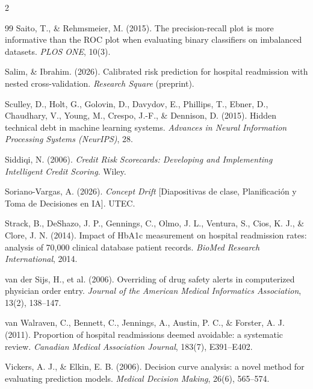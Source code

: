 \documentclass[11pt,a4paper]{article}
\begin{document}
{\begin{multicols}{2}
\begin{thebibliography}{99}
 Saito, T., \& Rehmsmeier, M. (2015). The precision-recall plot is more informative than the ROC plot when evaluating binary classifiers on imbalanced datasets. \emph{PLOS ONE}, 10(3).

 Salim, \& Ibrahim. (2026). Calibrated risk prediction for hospital readmission with nested cross-validation. \emph{Research Square} (preprint).

 Sculley, D., Holt, G., Golovin, D., Davydov, E., Phillips, T., Ebner, D., Chaudhary, V., Young, M., Crespo, J.-F., \& Dennison, D. (2015). Hidden technical debt in machine learning systems. \emph{Advances in Neural Information Processing Systems (NeurIPS)}, 28.

 Siddiqi, N. (2006). \emph{Credit Risk Scorecards: Developing and Implementing Intelligent Credit Scoring}. Wiley.

 Soriano-Vargas, A. (2026). \emph{Concept Drift} [Diapositivas de clase, Planificación y Toma de Decisiones en IA]. UTEC.

 Strack, B., DeShazo, J. P., Gennings, C., Olmo, J. L., Ventura, S., Cios, K. J., \& Clore, J. N. (2014). Impact of HbA1c measurement on hospital readmission rates: analysis of 70,000 clinical database patient records. \emph{BioMed Research International}, 2014.

 van der Sijs, H., et al. (2006). Overriding of drug safety alerts in computerized physician order entry. \emph{Journal of the American Medical Informatics Association}, 13(2), 138--147.

 van Walraven, C., Bennett, C., Jennings, A., Austin, P. C., \& Forster, A. J. (2011). Proportion of hospital readmissions deemed avoidable: a systematic review. \emph{Canadian Medical Association Journal}, 183(7), E391--E402.

 Vickers, A. J., \& Elkin, E. B. (2006). Decision curve analysis: a novel method for evaluating prediction models. \emph{Medical Decision Making}, 26(6), 565--574.

\end{thebibliography}
\end{multicols}}
\end{document}
